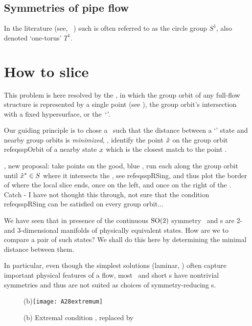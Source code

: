 \subsection{Symmetries of pipe flow}
\label{s:SymmPipe}

In the literature
(see, \eg\ \cite{Recke2010}) such  is often referred to as the
circle group $S^1$, also denoted `one-torus' $T^1$.

\section{How to slice}
\label{s:algorithm}

This problem is here resolved by the
{\mslices}, in which
the group orbit of any full-flow structure is represented by a single
point (see ), the group orbit's intersection with a
fixed hypersurface, or the \emph{`\slice'}.

Our guiding principle is to chose a \slice\ such that the distance
between a `{\template}' state {\slicep} and nearby group orbits is
\emph{minimized}, \ie, identify the point $\hat{x}$ on the group orbit
 refeq{sspOrbit} of a nearby state $x$ which is the closest match to
the {\template} point {\slicep}.

, new proposal: take points on the good,
    blue \po, run each along the group orbit until $\hat{x}^\ast \in S$
    where it intersects the \sliceBord, see  refeq{sspRSing}, and thus plot
    the border of where the local slice ends, once on the left, and once
    on the right of the {\template}. Catch - I have not thought this
    through, not sure that the condition  refeq{sspRSing} can be
    satisfied on every group orbit...

We have seen that in presence of the continuous $\textrm{SO}(2)$ symmetry
\reqva\ and \rpo s are 2- and 3-dimensional manifolds of physically
equivalent states. How are we to compare a pair of such states? We shall
do this here by determining the minimal distance between them.

In particular, even though the
simplest solutions (laminar, \etc) often capture important physical
features of a flow, most \eqva\ and short \po s have nontrivial
symmetries and thus are not suited as choices of symmetry-reducing
{\template s}.

\begin{figure}
   \centering
(b)\texttt{[image: A28extremum]}
   \caption{\label{fig:A28extremum1}
    (b) Extremal condition , replaced by
}
\end{figure}

